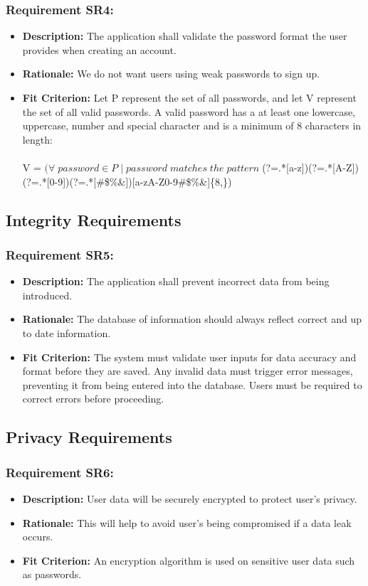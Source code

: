 \documentclass[12pt]{article}
\begin{document}
\subsubsection*{Requirement SR4:}
\begin{itemize}
  \item \textbf{Description:} The application shall validate the password format the user provides when creating an account.
  \item \textbf{Rationale:} We do not want users using weak passwords to sign up.
  \item \textbf{Fit Criterion:} Let P represent the set of all passwords, and let V represent the set of all valid passwords. A valid password has a at least one lowercase, uppercase, number and special character and is a minimum of 8 characters in length:\\\\
  V = $(\forall\; password \in P\;  |\; password \; matches \; the \; pattern \; $(?=.*[a-z])(?=.*[A-Z])(?=.*[0-9])(?=.*[\#\$\%\&\*\@])[a-zA-Z0-9\#\$\%\&\*\@]\{8,\})\\
\end{itemize}
\subsection{Integrity Requirements}
\subsubsection*{Requirement SR5:}
\begin{itemize}
  \item \textbf{Description:} The application shall prevent incorrect data from being introduced.
  \item \textbf{Rationale:} The database of information should always reflect correct and up to date information.
  \item \textbf{Fit Criterion:} The system must validate user inputs for data accuracy and format before they are saved. Any invalid data must trigger error messages, preventing it from being entered into the database. Users must be required to correct errors before proceeding.
\end{itemize}
\subsection{Privacy Requirements}
\subsubsection*{Requirement SR6:}
\begin{itemize}
  \item \textbf{Description:} User data will be securely encrypted to protect user’s privacy.
  \item \textbf{Rationale:} This will help to avoid user's being compromised if a data leak occurs.
  \item \textbf{Fit Criterion:} An encryption algorithm is used on sensitive user data such as passwords.
\end{itemize}
\end{document}
